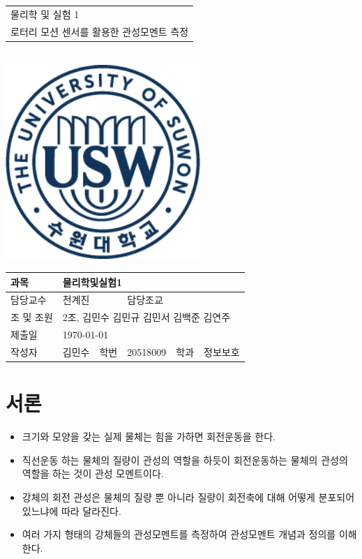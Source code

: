 \documentclass[12pt,a4paper]{article}
\begin{document}
\begin{titlepage}
    \centering
    \begin{tabular}{|C{15cm}|}
        \hline
        \rule{0in}{6ex}
        {\huge 물리학 및 실험 1\par} \\ 
        {\large 로터리 모션 센서를 활용한 관성모멘트 측정\par} \\
        \hline
    \end{tabular} \\
    \vspace{5cm}
    \includegraphics[height=7.36cm]{logo.png}\par
    \vspace{3cm}
    \begin{tabular}{|l|l|l|l|l|l|}
        \hline
        과목 & \multicolumn{5}{l|}{물리학및실험1} \\
        \hline
        담당교수 & \multicolumn{2}{l|}{전계진} & 담당조교 & \multicolumn{2}{l|}{} \\
        \hline
        조 및 조원 & \multicolumn{5}{l|}{2조, 김민수 김민규 김민서 김백준 김연주} \\
        \hline
        제출일 & \multicolumn{5}{l|}{\today} \\
        \hline
        작성자 & 김민수 & 학번 & 20518009 & 학과 & 정보보호 \\
        \hline
    \end{tabular}
\end{titlepage}
\section{서론}
\begin{itemize}
    \item 크기와 모양을 갖는 실제 물체는 힘을 가하면 회전운동을 한다.
    \item 직선운동 하는 물체의 질량이 관성의 역할을 하듯이 회전운동하는 물체의
        관성의 역할을 하는 것이 관성 모멘트이다.
    \item 강체의 회전 관성은 물체의 질량 뿐 아니라 질량이 회전축에 대해 어떻게
        분포되어 있느냐에 따라 달라진다.
    \item 여러 가지 형태의 강체들의 관성모멘트를 측정하여 관성모멘트 개념과 정의를
        이해한다.
\end{itemize}
\end{document}
